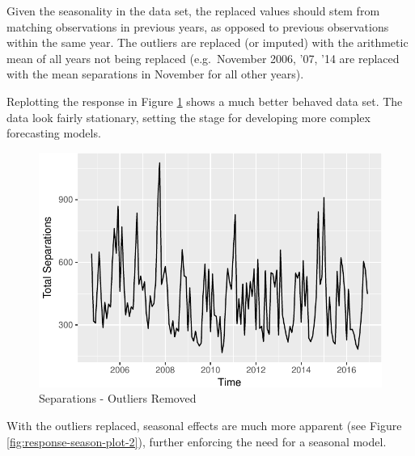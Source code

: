 \documentclass[12pt,letterpaper,toc=flat,oneside]{report}
\theoremstyle{definition}
\theoremstyle{definition}
\theoremstyle{definition}
\theoremstyle{remark}
\begin{document}
Given the seasonality in the data set, the replaced values should stem
from matching observations in previous years, as opposed to previous
observations within the same year. The outliers are replaced (or
imputed) with the arithmetic mean of all years not being replaced
(e.g.~November 2006, '07, '14 are replaced with the mean separations in
November for all other years).

Replotting the response in Figure \ref{fig:response-plot-2} shows a much
better behaved data set. The data look fairly stationary, setting the
stage for developing more complex forecasting models.

\begin{figure}[H]

{\centering \includegraphics{elliott-econometric-personnel-retention-18_files/figure-latex/response-plot-2-1} 

}

\caption{Separations - Outliers Removed}\label{fig:response-plot-2}
\end{figure}

With the outliers replaced, seasonal effects are much more apparent (see
Figure \ref{fig:response-season-plot-2}), further enforcing the need for
a seasonal model.
\end{document}
